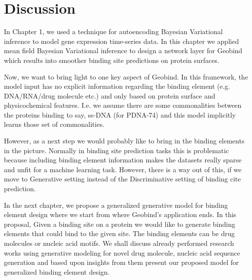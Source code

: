 \section{Discussion}
In Chapter 1, we used a technique for autoencoding Bayesian Variational inference to model gene
expression time-series data. In this chapter we applied mean field Bayesian Variational inference to
design a network layer for Geobind which results into smoother binding site predictions on protein
surfaces. 

Now, we want to bring light to one key aspect of Geobind. In this framework, the model input has no
explicit information regarding the binding element (e.g. DNA/RNA/drug molecule etc.) and only based on
protein surface and physicochemical features. I.e. we assume there are some commonalities between the proteins binding to
say, ss-DNA (for PDNA-74) and this model implicitly learns those set of commonalities.

However, as a next step we would probably like to bring in the binding elements in the
picture. Normally in binding site prediction tasks this is problematic because including binding
element information makes the
datasets really sparse and unfit for a machine learning task. However, there is a way out of this,
if we move to Generative setting instead of the Discriminative setting of binding cite prediction.

In the next chapter, we propose a generalized generative model for  binding element design where we
start from where Geobind's application ends. In this proposal, Given a binding site on a protein we
would like to generate binding elements that could bind to the given site. The binding elements
can be drug molecules or nucleic acid motifs. We shall discuss already performed research works
using generative modeling for novel drug molecule, nucleic acid sequence generation and based upon
insights from them present our proposed model for generalized binding element design.
